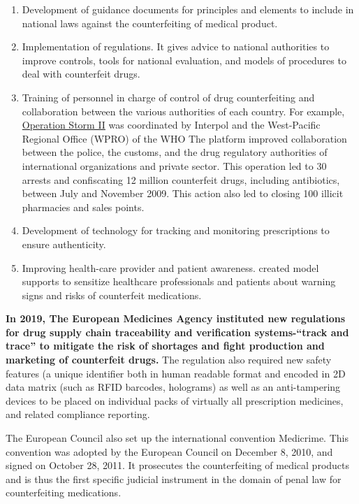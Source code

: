 \documentclass[
  11pt,
  paper=a4,
  ,captions=tableheading
]{scrartcl}
\providecommand{\tightlist}{%
  \setlength{\itemsep}{0pt}\setlength{\parskip}{0pt}}
\begin{document}
\begin{enumerate}
\def\labelenumi{\arabic{enumi}.}
\tightlist
\item
  Development of guidance documents for principles and elements to
  include in national laws against the counterfeiting of medical
  product.
\item
  Implementation of regulations. It gives advice to national authorities
  to improve controls, tools for national evaluation, and models of
  procedures to deal with counterfeit drugs.
\item
  Training of personnel in charge of control of drug counterfeiting and
  collaboration between the various authorities of each country. For
  example,
  \href{https://www.interpol.int/News-and-Events/News/2010/INTERPOL-applauds-Southeast-Asia-Operation-Storm-II-s-success-in-disrupting-trade-of-counterfeit-medical-products}{Operation
  Storm II} was coordinated by Interpol and the West-Pacific Regional
  Office (WPRO) of the WHO The platform improved collaboration between
  the police, the customs, and the drug regulatory authorities of
  international organizations and private sector. This operation led to
  30 arrests and confiscating 12 million counterfeit drugs, including
  antibiotics, between July and November 2009. This action also led to
  closing 100 illicit pharmacies and sales points.
\item
  Development of technology for tracking and monitoring prescriptions to
  ensure authenticity.
\item
  Improving health-care provider and patient awareness. created model
  supports to sensitize healthcare professionals and patients about
  warning signs and risks of counterfeit medications.
\end{enumerate}

\textbf{In 2019, The European Medicines Agency instituted new
regulations for drug supply chain traceability and verification
systems-``track and trace'' to mitigate the risk of shortages and fight
production and marketing of counterfeit drugs.} The regulation also
required new safety features (a unique identifier both in human readable
format and encoded in 2D data matrix (such as RFID barcodes, holograms)
as well as an anti-tampering devices to be placed on individual packs of
virtually all prescription medicines, and related compliance reporting.

The European Council also set up the international convention Medicrime.
This convention was adopted by the European Council on December 8, 2010,
and signed on October 28, 2011. It prosecutes the counterfeiting of
medical products and is thus the first specific judicial instrument in
the domain of penal law for counterfeiting medications.
\end{document}
